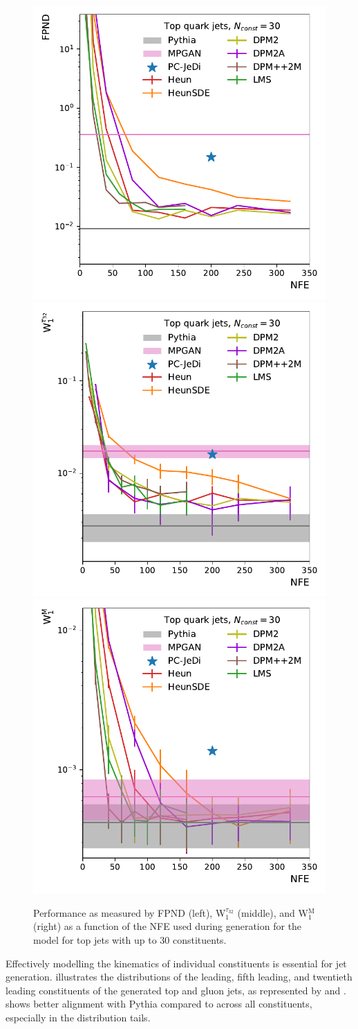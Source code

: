 \begin{figure}[htpb]
    \centering
    \includegraphics[width=0.32\linewidth]{Figures/jet_generation/droid/30/metrics_vs_steps/t/t_fpnd.pdf}
    \includegraphics[width=0.32\linewidth]{Figures/jet_generation/droid/30/metrics_vs_steps/t/t_w1_tau_32.pdf}
    \includegraphics[width=0.32\linewidth]{Figures/jet_generation/droid/30/metrics_vs_steps/t/t_w1m.pdf}
    \caption{Performance as measured by FPND (left), W$_1^{\tau_{32}}$ (middle), and W$_1^\mathrm{M}$ (right) as a function of the NFE used during generation for the \pcdroid model for top jets with up to 30 constituents.}
    \label{fig:metrics_vs_steps-30}
\end{figure}

Effectively modelling the kinematics of individual constituents is essential for jet generation.
 illustrates the \pt distributions of the leading, fifth leading, and twentieth leading constituents of the generated top and gluon jets, as represented by \pcdroid and \pcjedi.
\pcdroid shows better alignment with Pythia compared to \pcjedi across all constituents, especially in the distribution tails.


